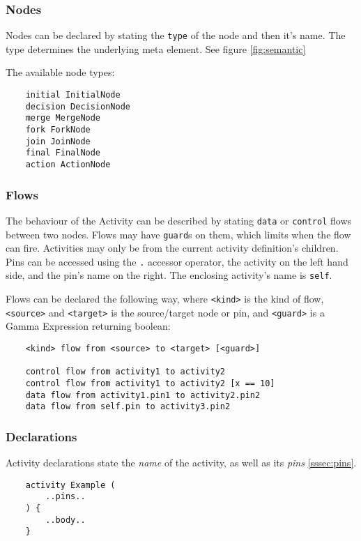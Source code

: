 \subsubsection*{Nodes}\label{sssec:nodes}

Nodes can be declared by stating the \verb|type| of the node and then it's name. The type determines the underlying meta element. See figure \ref{fig:semantic}

The available node types:

\begin{verbatim}
	initial InitialNode
	decision DecisionNode
	merge MergeNode
	fork ForkNode
	join JoinNode
	final FinalNode
	action ActionNode
\end{verbatim}

\subsubsection*{Flows}\label{sssec:flows}

The behaviour of the Activity can be described by stating \verb|data| or \verb|control| flows between two nodes. Flows may have \verb|guard|s on them, which limits when the flow can fire. Activities may only be from the current activity definition's children. Pins can be accessed using the \verb|.| accessor operator, the activity on the left hand side, and the pin's name on the right. The enclosing activity's name is \verb|self|.

Flows can be declared the following way, where \verb|<kind>| is the kind of flow, \verb|<source>| and \verb|<target>| is the source/target node or pin, and \verb|<guard>| is a Gamma Expression returning boolean:

\begin{verbatim}
	<kind> flow from <source> to <target> [<guard>]
	
	control flow from activity1 to activity2
	control flow from activity1 to activity2 [x == 10]
	data flow from activity1.pin1 to activity2.pin2
	data flow from self.pin to activity3.pin2
\end{verbatim}

\subsubsection*{Declarations}

Activity declarations state the \emph{name} of the activity, as well as its \emph{pins} \ref{sssec:pins}. 


\begin{lstlisting}
	activity Example (
		..pins..
	) {
		..body..
	}
\end{lstlisting}

